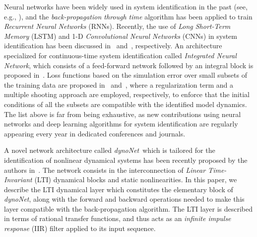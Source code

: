 \documentclass{article}
\newcommand{\Name}{\emph{dynoNet}}
\begin{document}
Neural networks have been widely used in system identification in the past (see, e.g., 
 \cite{werbos1989neural, chen1990non,chen1992neural}), and the \emph{back-propagation through time} algorithm \cite{williams1995gradient} has been applied to train \emph{Recurrent Neural Networks} (RNNs). Recently, the use of 
 \emph{Long Short-Term Memory} (LSTM)  and 1-D  \emph{Convolutional Neural Networks} (CNNs) in system identification has been discussed in~\cite{gonzalez2018non, wang2017new} and~\cite{andersson:2019deep}, respectively.  
 An architecture specialized for continuous-time system identification called \emph{Integrated Neural Network}, %
 {which consists of} a feed-forward network followed by an integral block is proposed in~\cite{Mav2020}.  Loss functions based on the simulation error over small subsets of the training data are proposed in~\cite{forgione2019model,forgione2021continuous} and~\cite{ribeiro_smoothness_2020}, where a regularization  term and a multiple shooting approach are employed, respectively, to enforce 
   that the initial conditions of all the subsets are compatible with the identified model dynamics. 
   The list above is far from being exhaustive, as new contributions using neural networks and deep learning algorithms for system identification are regularly appearing   every year in dedicated conferences and journals.  
 
 
  A novel network architecture called \Name \ {which is}  tailored for the identification of nonlinear dynamical systems has been recently proposed by the authors in~\cite{forgione2021dynonet}. The network consists in the interconnection of \emph{Linear Time-Invariant} (LTI) dynamical blocks and static nonlinearities.   
   In this paper, we describe the LTI dynamical layer which constitutes the elementary block of \Name, along with the  forward and backward operations needed to make this layer compatible with the back-propagation algorithm. The LTI layer is described  in terms of rational transfer functions, and thus acts as an \emph{infinite impulse response} (IIR) filter applied to its input sequence. 
%  
   
\end{document}
